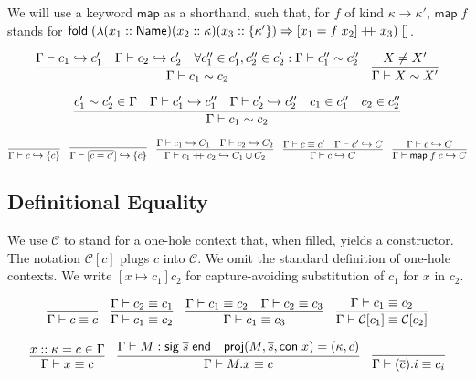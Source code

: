 \documentclass{article}
\newcommand{\mt}[1]{\mathsf{#1}}
\newcommand{\rc}{+ \hspace{-.075in} + \;}
\begin{document}
We will use a keyword $\mt{map}$ as a shorthand, such that, for $f$ of kind $\kappa \to \kappa'$, $\mt{map} \; f$ stands for $\mt{fold} \; (\lambda (x_1 :: \mt{Name}) (x_2 :: \kappa) (x_3 :: \{\kappa'\}) \Rightarrow [x_1 = f \; x_2] \rc x_3) \; []$.

$$\infer{\Gamma \vdash c_1 \sim c_2}{
  \Gamma \vdash c_1 \hookrightarrow c'_1
  & \Gamma \vdash c_2 \hookrightarrow c'_2
  & \forall c''_1 \in c'_1, c''_2 \in c'_2: \Gamma \vdash c''_1 \sim c''_2
}
\quad \infer{\Gamma \vdash X \sim X'}{
  X \neq X'
}$$

$$\infer{\Gamma \vdash c_1 \sim c_2}{
  c'_1 \sim c'_2 \in \Gamma
  & \Gamma \vdash c'_1 \hookrightarrow c''_1
  & \Gamma \vdash c'_2 \hookrightarrow c''_2
  & c_1 \in c''_1
  & c_2 \in c''_2
}$$

$$\infer{\Gamma \vdash c \hookrightarrow \{c\}}{}
\quad \infer{\Gamma \vdash [\overline{c = c'}] \hookrightarrow \{\overline{c}\}}{}
\quad \infer{\Gamma \vdash c_1 \rc c_2 \hookrightarrow C_1 \cup C_2}{
  \Gamma \vdash c_1 \hookrightarrow C_1
  & \Gamma \vdash c_2 \hookrightarrow C_2
}
\quad \infer{\Gamma \vdash c \hookrightarrow C}{
  \Gamma \vdash c \equiv c'
  & \Gamma \vdash c' \hookrightarrow C
}
\quad \infer{\Gamma \vdash \mt{map} \; f \; c \hookrightarrow C}{
  \Gamma \vdash c \hookrightarrow C
}$$

\subsection{Definitional Equality}

We use $\mathcal C$ to stand for a one-hole context that, when filled, yields a constructor.  The notation $\mathcal C[c]$ plugs $c$ into $\mathcal C$.  We omit the standard definition of one-hole contexts.  We write $[x \mapsto c_1]c_2$ for capture-avoiding substitution of $c_1$ for $x$ in $c_2$.

$$\infer{\Gamma \vdash c \equiv c}{}
\quad \infer{\Gamma \vdash c_1 \equiv c_2}{
  \Gamma \vdash c_2 \equiv c_1
}
\quad \infer{\Gamma \vdash c_1 \equiv c_3}{
  \Gamma \vdash c_1 \equiv c_2
  & \Gamma \vdash c_2 \equiv c_3
}
\quad \infer{\Gamma \vdash \mathcal C[c_1] \equiv \mathcal C[c_2]}{
  \Gamma \vdash c_1 \equiv c_2
}$$

$$\infer{\Gamma \vdash x \equiv c}{
  x :: \kappa = c \in \Gamma
}
\quad \infer{\Gamma \vdash M.x \equiv c}{
  \Gamma \vdash M : \mt{sig} \; \overline{s} \; \mt{end}
  & \mt{proj}(M, \overline{s}, \mt{con} \; x) = (\kappa, c)
}
\quad \infer{\Gamma \vdash (\overline c).i \equiv c_i}{}$$
\end{document}
